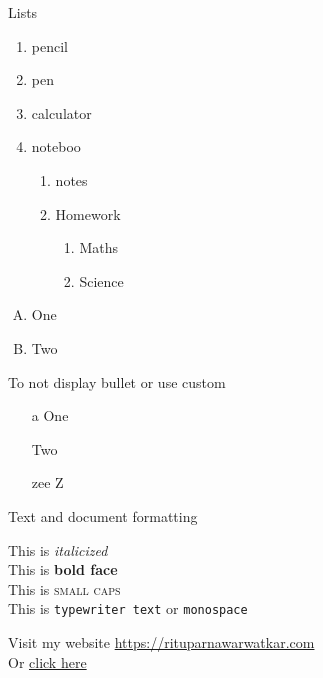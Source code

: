 \documentclass[11pt]{article}
\begin{document}
\pagebreak
Lists
\begin{enumerate}
    \item pencil
    \item pen
    \item calculator
    \item noteboo
        \begin{enumerate}
            \item notes
            \item Homework
            \begin{enumerate}
                \item Maths
                \item Science
            \end{enumerate}
        \end{enumerate}
\end{enumerate}

\vspace{1cm}

\begin{enumerate}[A.]
    \item One
    \item Two
\end{enumerate}

To not display bullet or use custom 

\begin{enumerate}[A.]
    \item [a] One
    \item [] Two
    \item [zee] Z
\end{enumerate}

Text and document formatting

This is \textit{italicized}\\
This is \textbf{bold face}\\
This is \textsc{small caps}\\
This is \texttt{typewriter text} or \texttt{monospace}

Visit my website \url{https://rituparnawarwatkar.com}\\
Or \href{https://rituparnawarwatkar.com}{click here}\\[2cm] 
\end{document}
